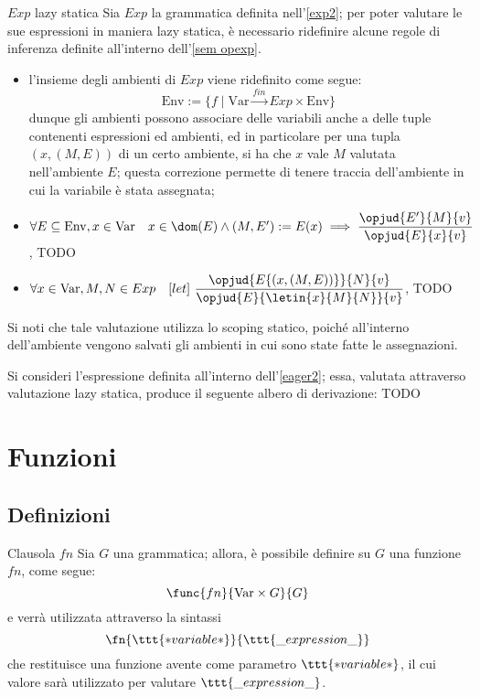 \documentclass[a4paper, 12pt]{report}
\begin{document}
    \begin{framedobs}{$Exp$ lazy statica}
        Sia $Exp$ la grammatica definita nell'\cref{exp2}; per poter valutare le sue espressioni in maniera lazy statica, è necessario ridefinire alcune regole di inferenza definite all'interno dell'\cref{sem opexp}.

        \begin{itemize}
            \item l'insieme degli ambienti di $Exp$ viene ridefinito come segue: $$\mathrm{Env} := \{f \mid \mathrm{Var} \xrightarrow{fin} Exp \times \mathrm{Env} \}$$ dunque gli ambienti possono associare delle variabili anche a delle tuple contenenti espressioni ed ambienti, ed in particolare per una tupla $(x, (M, E))$ di un certo ambiente, si ha che $x$ vale $M$ valutata nell'ambiente $E$; questa correzione permette di tenere traccia dell'ambiente in cui la variabile è stata assegnata;
            \item $\forall E \subseteq \mathrm{Env}, x \in \mathrm{Var} \quad x \in \dom(E) \land (M, E') := E(x) \implies \dfrac{\opjud{E'}{M}{v}}{\opjud{E}{x}{v}}$, TODO
            \item $\forall x \in \mathrm{Var}, M, N \in Exp \quad [let] \ \dfrac{\opjud{E\{(x, (M, E))\}}{N}{v}}{\opjud{E}{\letin{x}{M}{N}}{v}}$, TODO
        \end{itemize}

        Si noti che tale valutazione utilizza lo scoping statico, poiché all'interno dell'ambiente vengono salvati gli ambienti in cui sono state fatte le assegnazioni.
    \end{framedobs}

    \begin{example}
        Si consideri l'espressione definita all'interno dell'\cref{eager2}; essa, valutata attraverso valutazione lazy statica, produce il seguente albero di derivazione: TODO
    \end{example}

    \section{Funzioni}

    \subsection{Definizioni}

    \begin{frameddefn}[label={fn}]{Clausola $fn$}
        Sia $G$ una grammatica; allora, è possibile definire su $G$ una funzione $fn$, come segue: $$\func{fn}{\mathrm{Var} \times G}{G}$$ e verrà utilizzata attraverso la sintassi $$\fn{\ttt{*variable*}}{\ttt{\_expression\_}}$$ che restituisce una funzione avente come parametro $\ttt{*variable*}$, il cui valore sarà utilizzato per valutare $\ttt{\_expression\_}$.
    \end{frameddefn}
\end{document}
